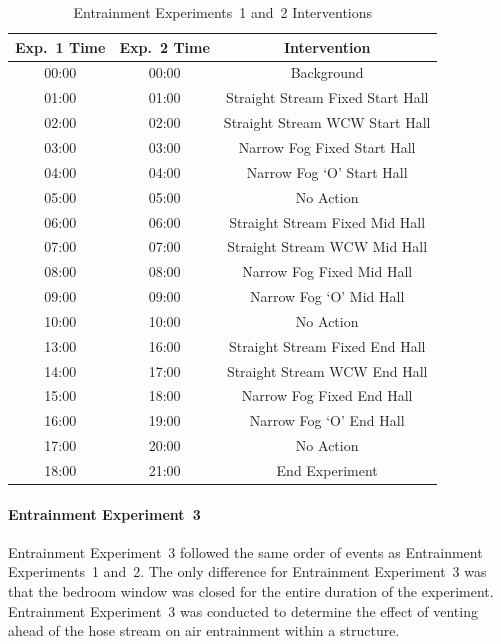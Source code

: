 \documentclass[12pt,oneside]{book}
\begin{document}
\begin{table}[H]
	\centering
	\caption{Entrainment Experiments~1 and~2 Interventions}
	\begin{tabular}{|c|c|c|} 
		\hline
		Exp.~1 Time 	& 	Exp.~2 Time 	& 	Intervention 	\\ \hline \hline
			00:00 		& 	00:00  			& 	Background	\\ \hline
			01:00	 	& 	01:00  			& 	Straight Stream Fixed Start Hall 	\\ \hline
			02:00		& 	02:00  			& 	Straight Stream WCW Start Hall 	\\ \hline
			03:00	 	& 	03:00  			& 	Narrow Fog Fixed Start Hall 	\\ \hline
			04:00		& 	04:00  			& 	Narrow Fog `O' Start Hall 	\\ \hline
			05:00		& 	05:00  			&	No Action 	\\ \hline
			06:00		& 	06:00  			& 	Straight Stream Fixed Mid Hall 	\\ \hline
			07:00		& 	07:00  			& 	Straight Stream WCW Mid Hall 	\\ \hline
			08:00		& 	08:00  			& 	Narrow Fog Fixed Mid Hall 	\\ \hline
			09:00		& 	09:00  			& 	Narrow Fog `O' Mid Hall 	\\ \hline
			10:00		& 	10:00  			& 	No Action 	\\ \hline
			13:00		& 	16:00  			& 	Straight Stream Fixed End Hall 	\\ \hline
			14:00		& 	17:00  			& 	Straight Stream WCW End Hall 	\\ \hline
			15:00		& 	18:00  			& 	Narrow Fog Fixed End Hall 	\\ \hline
			16:00		& 	19:00  			& 	Narrow Fog `O' End Hall 	\\ \hline
			17:00		& 	20:00  			& 	No Action 	\\ \hline
			18:00		& 	21:00  			& 	End Experiment 	\\ \hline
	\end{tabular}
	\label{Table:EntExp1_and_2_Interventions}
\end{table}

\FloatBarrier

\paragraph{Entrainment Experiment~3} \mbox{}
Entrainment Experiment~3 followed the same order of events as Entrainment Experiments~1 and~2. The only difference for Entrainment Experiment~3 was that the bedroom window was closed for the entire duration of the experiment. Entrainment Experiment~3 was conducted to determine the effect of venting ahead of the hose stream on air entrainment within a structure. 
\end{document}
